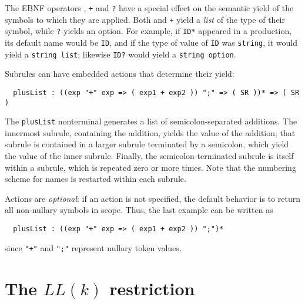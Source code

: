 The EBNF operators {\tt *}, {\tt +} and {\tt ?} have a special effect on the semantic yield of the symbols to which they are applied.  Both {\tt *} and {\tt +} yield a \emph{list} of the type of their symbol, while {\tt ?} yields an option.  For example, if {\tt ID*} appeared in a production, its default name would be {\tt ID}, and if the type of value of {\tt ID} was {\tt string}, it would yield a {\tt string list}; likewise {\tt ID?} would yield a {\tt string option}.  

Subrules can have embedded actions that determine their yield:
\begin{verbatim}
  plusList : ((exp "+" exp => ( exp1 + exp2 )) ";" => ( SR ))* => ( SR )
\end{verbatim}
The {\tt plusList} nonterminal generates a list of semicolon-separated additions.  The innermost subrule, containing the addition, yields the value of the addition; that subrule is contained in a larger subrule terminated by a semicolon, which yield the value of the inner subrule.  Finally, the semicolon-terminated subrule is itself within a subrule, which is repeated zero or more times.  Note that the numbering scheme for names is restarted within each subrule.

Actions are \emph{optional}: if an action is not specified, the default behavior is to return all non-nullary symbols in scope.  Thus, the last example can be written as 
\begin{verbatim}
  plusList : ((exp "+" exp => ( exp1 + exp2 )) ";")*
\end{verbatim}
since {\tt "+"} and {\tt ";"} represent nullary token values.

\section{The $LL(k)$ restriction}\label{sec:antlr-llk}

